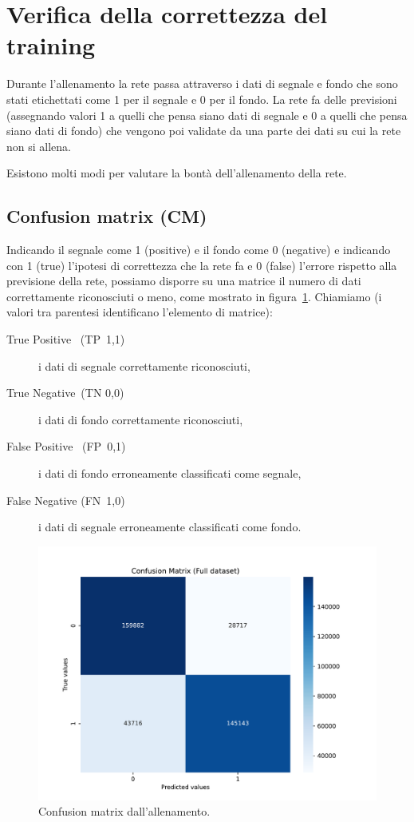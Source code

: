 \newpage

\section{Verifica della correttezza del training}
    Durante l'allenamento la rete passa attraverso i dati di segnale e fondo che sono stati etichettati come 1 per il segnale e 0 per il fondo. La rete fa delle previsioni (assegnando valori 1 a quelli che pensa siano dati di segnale e 0 a quelli che pensa siano dati di fondo) che vengono poi validate da una parte dei dati su cui la rete non si allena.
    
    Esistono molti modi per valutare la bontà dell'allenamento della rete.

    \subsection{Confusion matrix (CM)}
        Indicando il segnale come 1 (positive) e il fondo come 0 (negative) e indicando con 1 (true) l'ipotesi di correttezza che la rete fa e 0 (false) l'errore rispetto alla previsione della rete, possiamo disporre su una matrice il numero di dati correttamente riconosciuti o meno, come mostrato in figura~\ref{fig:confusion-matrix}. Chiamiamo (i valori tra parentesi identificano l'elemento di matrice):
        \begin{description}
            \item[True Positive \,\,\,(TP \,1,1)] i dati di segnale correttamente riconosciuti,

            \item[True Negative \,(TN 0,0)] i dati di fondo correttamente riconosciuti,

            \item[False Positive \,\,\,(FP \,0,1)] i dati di fondo erroneamente classificati come segnale,

            \item[False Negative (FN \,1,0)] i dati di segnale erroneamente classificati come fondo.
        \end{description}
         
        \begin{figure}[h]
            \centering
            \includegraphics[width=0.80\linewidth]{res/fig/3-chapter/6-confusion-matrix.pdf}
            \caption{Confusion matrix dall'allenamento.}
            \label{fig:confusion-matrix}
        \end{figure}

